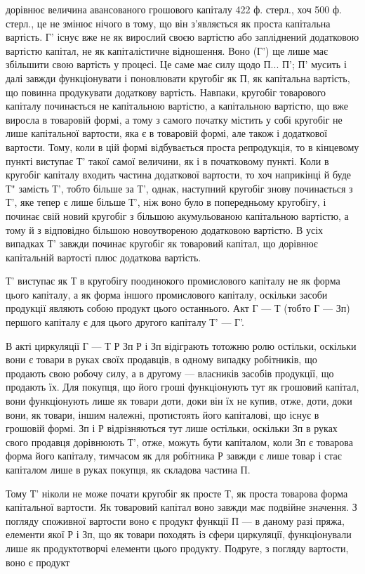 \parcont{}  %
дорівнює величина авансованого грошового капіталу 422 ф. стерл., хоч
500 ф. стерл., це не змінює нічого в тому, що він з’являється як проста
капітальна вартість. Г' існує вже не як вирослий своєю вартістю або
запліднений додатковою вартістю капітал, не як капіталістичне відношення.
Воно (Г') ще лише має збільшити свою вартість у процесі. Це саме має
силу щодо П... П'; П' мусить і далі завжди функціонувати і поновлювати
кругобіг як П, як капітальна вартість, що повинна продукувати додаткову
вартість. Навпаки, кругобіг товарового капіталу починається не
капітальною вартістю, а капітальною вартістю, що вже виросла в товаровій
формі, а тому з самого початку містить у собі кругобіг не лише капітальної
вартости, яка є в товаровій формі, але також і додаткової вартости.
Тому, коли в цій формі відбувається проста репродукція, то в кінцевому
пункті виступає Т' такої самої величини, як і в початковому пункті.
Коли в кругобіг капіталу входить частина додаткової вартости, то хоч
наприкінці й буде Т" замість Т', тобто більше за Т', однак, наступний кругобіг
знову починається з Т', яке тепер є лише більше Т', ніж воно
було в попередньому кругобігу, і починає свій новий кругобіг з більшою
акумульованою капітальною вартістю, а тому й з відповідно більшою
новоутвореною додатковою вартістю. В усіх випадках Т' завжди починає
кругобіг як товаровий капітал, що дорівнює капітальній вартості плюс
додаткова вартість.

Т' виступає як Т в кругобігу поодинокого промислового капіталу не
як форма цього капіталу, а як форма іншого промислового капіталу,
оскільки засоби продукції являють собою продукт цього останнього.
Акт Г — Т (тобто Г — Зп) першого капіталу є для цього другого капіталу
Т' — Г'.

В акті циркуляції Г — Т Р Зп Р і Зп відіграють тотожню ролю остільки,
оскільки вони є товари в руках своїх продавців, в одному випадку
робітників, що продають свою робочу силу, а в другому — власників
засобів продукції, що продають їх. Для покупця, що його гроші
функціонують тут як грошовий капітал, вони функціонують
лише як товари доти, доки він їх не купив, отже, доти, доки
вони, як товари, іншим належні, протистоять його капіталові, що
існує в грошовій формі. Зп і Р відрізняються тут лише остільки,
оскільки Зп в руках свого продавця дорівнюють Т', отже, можуть бути
капіталом, коли Зп є товарова форма його капіталу, тимчасом як для
робітника Р завжди є лише товар і стає капіталом лише в руках покупця,
як складова частина П.

Тому Т' ніколи не може почати кругобіг як просте Т, як проста
товарова форма капітальної вартости. Як товаровий капітал воно завжди
має подвійне значення. З погляду споживної вартости воно є продукт
функції П — в даному разі пряжа, елементи якої Р і Зп, що як товари
походять із сфери циркуляції, функціонували лише як продуктотворчі
елементи цього продукту. Подруге, з погляду вартости, воно є продукт
\parbreak{}  %
